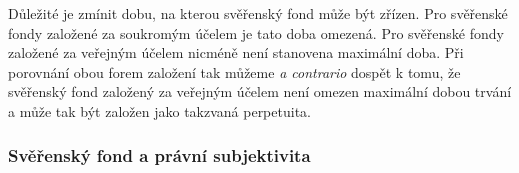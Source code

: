 \documentclass{article}
\begin{document}
Důležité je zmínit dobu, na kterou svěřenský fond může být zřízen. Pro svěřenské fondy založené za soukromým účelem je tato doba omezená. Pro svěřenské fondy založené za veřejným účelem nicméně není stanovena maximální doba. Při porovnání obou forem založení tak můžeme \textit{a contrario} dospět k tomu, že svěřenský fond založený za veřejným účelem není omezen maximální dobou trvání a může tak být založen jako takzvaná perpetuita.\\



\subsubsection{Svěřenský fond a právní subjektivita}




\end{document}
